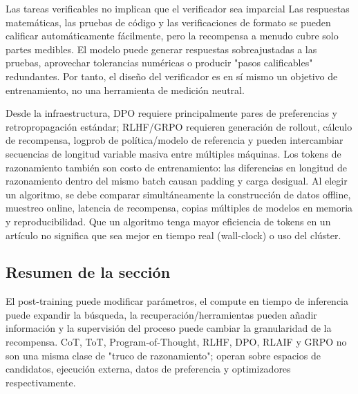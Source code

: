 \begin{warningbox}{Las tareas verificables no implican que el verificador sea imparcial}
Las respuestas matemáticas, las pruebas de código y las verificaciones de formato se pueden calificar automáticamente fácilmente, pero la recompensa a menudo cubre solo partes medibles. El modelo puede generar respuestas sobreajustadas a las pruebas, aprovechar tolerancias numéricas o producir "pasos calificables" redundantes. Por tanto, el diseño del verificador es en sí mismo un objetivo de entrenamiento, no una herramienta de medición neutral.
\end{warningbox}

Desde la infraestructura, DPO requiere principalmente pares de preferencias y retropropagación estándar; RLHF/GRPO requieren generación de rollout, cálculo de recompensa, logprob de política/modelo de referencia y pueden intercambiar secuencias de longitud variable masiva entre múltiples máquinas. Los tokens de razonamiento también son costo de entrenamiento: las diferencias en longitud de razonamiento dentro del mismo batch causan padding y carga desigual. Al elegir un algoritmo, se debe comparar simultáneamente la construcción de datos offline, muestreo online, latencia de recompensa, copias múltiples de modelos en memoria y reproducibilidad. Que un algoritmo tenga mayor eficiencia de tokens en un artículo no significa que sea mejor en tiempo real (wall-clock) o uso del clúster.

\subsection{Resumen de la sección}

El post-training puede modificar parámetros, el compute en tiempo de inferencia puede expandir la búsqueda, la recuperación/herramientas pueden añadir información y la supervisión del proceso puede cambiar la granularidad de la recompensa. CoT, ToT, Program-of-Thought, RLHF, DPO, RLAIF y GRPO no son una misma clase de "truco de razonamiento"; operan sobre espacios de candidatos, ejecución externa, datos de preferencia y optimizadores respectivamente.

